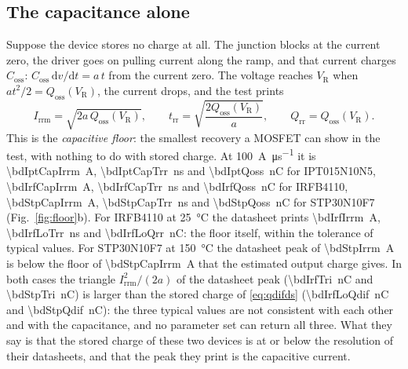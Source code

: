 \documentclass[10pt,a4paper]{scrartcl}
\newcommand{\VR}{V_\mathrm{R}}
\newcommand{\Irrm}{I_\mathrm{rrm}}
\newcommand{\Qrr}{Q_\mathrm{rr}}
\newcommand{\Qoss}{Q_\mathrm{oss}}
\newcommand{\Coss}{C_\mathrm{oss}}
\newcommand{\trr}{t_\mathrm{rr}}
\newcommand{\diff}{\mathrm{d}}
\newcommand{\IPT}{IPT015N10N5}
\newcommand{\IRF}{IRFB4110}
\newcommand{\STP}{STP30N10F7}
\begin{document}
\subsection{The capacitance alone}
\label{sec:floor}
Suppose the device stores no charge at all. The junction blocks at the current zero, the driver goes on pulling current along the ramp, and that current charges $\Coss$: $\Coss\,\diff v/\diff t = a\,t$ from the current zero. The voltage reaches $\VR$ when $a t^2/2 = \Qoss(\VR)$, the current drops, and the test prints
\begin{equation}
\Irrm = \sqrt{2a\,\Qoss(\VR)} , \qquad \trr = \sqrt{\frac{2\Qoss(\VR)}{a}} , \qquad \Qrr = \Qoss(\VR) .
\label{eq:floor}
\end{equation}
This is the \emph{capacitive floor}: the smallest recovery a MOSFET can show in the test, with nothing to do with stored charge. At \SI{100}{\ampere\per\micro\second} it is \SI{\bdIptCapIrrm}{\ampere}, \SI{\bdIptCapTrr}{\nano\second} and \SI{\bdIptQoss}{\nano\coulomb} for \IPT{}, \SI{\bdIrfCapIrrm}{\ampere}, \SI{\bdIrfCapTrr}{\nano\second} and \SI{\bdIrfQoss}{\nano\coulomb} for \IRF{}, \SI{\bdStpCapIrrm}{\ampere}, \SI{\bdStpCapTrr}{\nano\second} and \SI{\bdStpQoss}{\nano\coulomb} for \STP{} (Fig.~\ref{fig:floor}b). For \IRF{} at \SI{25}{\celsius} the datasheet prints \SI{\bdIrfIrrm}{\ampere}, \SI{\bdIrfLoTrr}{\nano\second} and \SI{\bdIrfLoQrr}{\nano\coulomb}: the floor itself, within the tolerance of typical values. For \STP{} at \SI{150}{\celsius} the datasheet peak of \SI{\bdStpIrrm}{\ampere} is below the floor of \SI{\bdStpCapIrrm}{\ampere} that the estimated output charge gives. In both cases the triangle $\Irrm^2/(2a)$ of the datasheet peak (\SI{\bdIrfTri}{\nano\coulomb} and \SI{\bdStpTri}{\nano\coulomb}) is larger than the stored charge of \eqref{eq:qdifds} (\SI{\bdIrfLoQdif}{\nano\coulomb} and \SI{\bdStpQdif}{\nano\coulomb}): the three typical values are not consistent with each other and with the capacitance, and no parameter set can return all three. What they say is that the stored charge of these two devices is at or below the resolution of their datasheets, and that the peak they print is the capacitive current.
\end{document}
